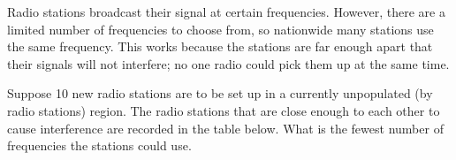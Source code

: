 \documentclass{book}
\begin{document}
\setcounter{project}{41}
\addtocounter{project}{-1}
\begin{activity}[]\label{activity-34}
\hypertarget{p-386}{}%
Radio stations broadcast their signal at certain frequencies. However, there are a limited number of frequencies to choose from, so nationwide many stations use the same frequency. This works because the stations are far enough apart that their signals will not interfere; no one radio could pick them up at the same time.%
\par
\hypertarget{p-387}{}%
Suppose 10 new radio stations are to be set up in a currently unpopulated (by radio stations) region. The radio stations that are close enough to each other to cause interference are recorded in the table below. What is the fewest number of frequencies the stations could use.%
\begin{sidebyside}{1}{0}{0}{0}
\begin{sbspanel}{1}
\end{sbspanel}
\end{sidebyside}
\end{activity}
\end{document}
